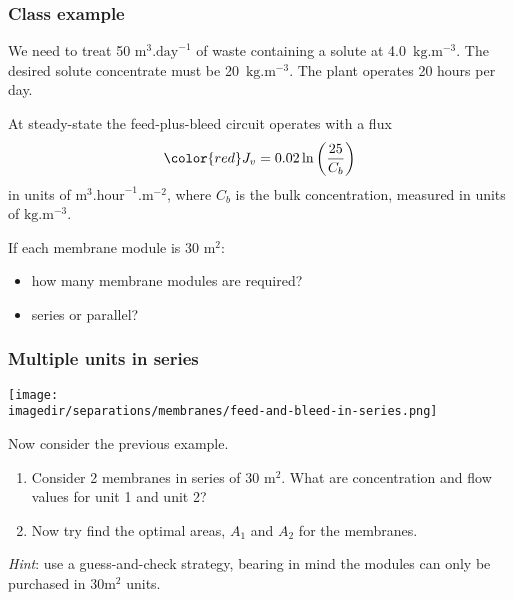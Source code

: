 \begin{frame}\frametitle{Class example}
	We need to treat 50 $\text{m}^3\text{.day}^{-1}$ of waste containing a solute at 4.0~$\text{kg}\text{.m}^{-3}$. The desired solute concentrate must be 20~$\text{kg}\text{.m}^{-3}$. The plant operates 20 hours per day.

	\vspace{12pt}
	At steady-state the feed-plus-bleed circuit operates with a flux
	\[
		{\color{red}J_v} = 0.02 \ln \left(\frac{25}{C_b} \right)
	\]
	in units of $\text{m}^3.\text{hour}^{-1}.\text{m}^{-2}$, where $C_b$ is the bulk concentration, measured in units of $\text{kg}\text{.m}^{-3}$.

	\vspace{12pt}
	If each membrane module is 30 m$^2$:
	\begin{itemize}
		\item	how many membrane modules are required?
		\item	series or parallel?
	\end{itemize}
\end{frame}

\begin{frame}\frametitle{Multiple units in series}
	\begin{center}
		\texttt{[image: \\imagedir/separations/membranes/feed-and-bleed-in-series.png]}
	\end{center}

	Now consider the previous example.
    \begin{enumerate}
        \item    Consider 2 membranes in series of 30 m$^2$. What are concentration and flow values for unit 1 and unit 2?
        \item    Now try find the optimal areas, $A_1$ and $A_2$ for the membranes.
    \end{enumerate} 
    
    \vspace{12pt}
    \emph{Hint}: use a guess-and-check strategy, bearing in mind the modules can only be purchased in 30m$^2$ units.
\end{frame}

